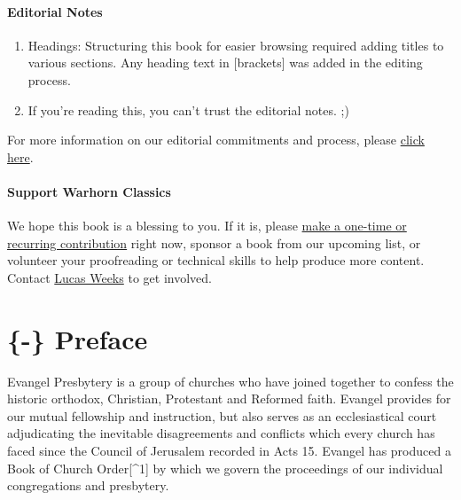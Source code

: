 \documentclass[
]{book}
\providecommand{\tightlist}{%
  \setlength{\itemsep}{0pt}\setlength{\parskip}{0pt}}
\begin{document}
\hypertarget{editorial-notes}{%
\subsubsection*{Editorial Notes}\label{editorial-notes}}

\begin{enumerate}
\def\labelenumi{\arabic{enumi}.}
\tightlist
\item
  Headings: Structuring this book for easier browsing required adding titles to various sections. Any heading text in {[}brackets{]} was added in the editing process.
\item
  If you're reading this, you can't trust the editorial notes. ;)
\end{enumerate}

For more information on our editorial commitments and process, please \href{https://classics.warhornmedia.com/editorial}{click here}.

\hypertarget{support-warhorn-classics}{%
\subsubsection*{Support Warhorn Classics}\label{support-warhorn-classics}}

We hope this book is a blessing to you. If it is, please \href{https://warhornmedia.com/give}{make a one-time or recurring contribution} right now, sponsor a book from our upcoming list, or volunteer your proofreading or technical skills to help produce more content. Contact \href{mailto:lucas@beggarsborn.com}{Lucas Weeks} to get involved.

\clearpage
\setcounter{page}{1}

\hypertarget{preface}{%
\chapter{\{-\} Preface}\label{preface}}

Evangel Presbytery is a group of churches who have joined together to confess the historic orthodox, Christian, Protestant and Reformed faith. Evangel provides for our mutual fellowship and instruction, but also serves as an ecclesiastical court adjudicating the inevitable disagreements and conflicts which every church has faced since the Council of Jerusalem recorded in Acts 15. Evangel has produced a Book of Church Order{[}\^{}1{]} by which we govern the proceedings of our individual congregations and presbytery.
\end{document}
